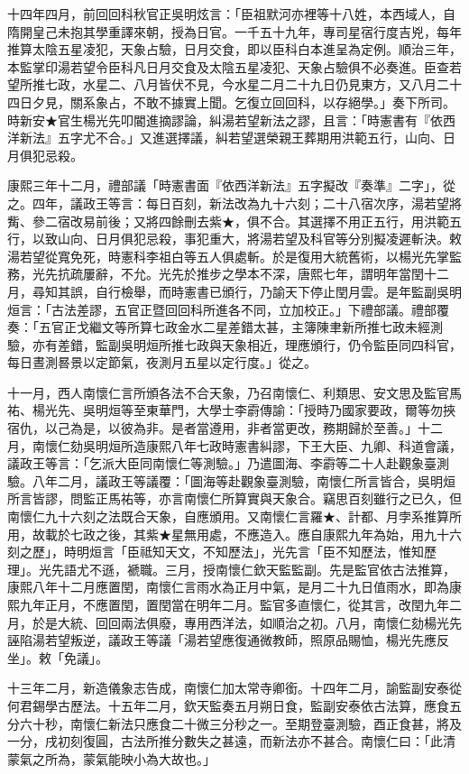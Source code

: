 \begin{pinyinscope}
十四年四月，前回回科秋官正吳明炫言：「臣祖默河亦裡等十八姓，本西域人，自隋開皇己未抱其學重譯來朝，授為日官。一千五十九年，專司星宿行度吉兇，每年推算太陰五星凌犯，天象占驗，日月交食，即以臣科白本進呈為定例。順治三年，本監掌印湯若望令臣科凡日月交食及太陰五星凌犯、天象占驗俱不必奏進。臣查若望所推七政，水星二、八月皆伏不見，今水星二月二十九日仍見東方，又八月二十四日夕見，關系象占，不敢不據實上聞。乞復立回回科，以存絕學。」奏下所司。時新安★官生楊光先叩閽進摘謬論，糾湯若望新法之謬，且言：「時憲書有『依西洋新法』五字尤不合。」又進選擇議，糾若望選榮親王葬期用洪範五行，山向、日月俱犯忌殺。

康熙三年十二月，禮部議「時憲書面『依西洋新法』五字擬改『奏準』二字」，從之。四年，議政王等言：每日百刻，新法改為九十六刻；二十八宿次序，湯若望將觜、參二宿改易前後；又將四餘刪去紫★，俱不合。其選擇不用正五行，用洪範五行，以致山向、日月俱犯忌殺，事犯重大，將湯若望及科官等分別擬凌遲斬決。敕湯若望從寬免死，時憲科李祖白等五人俱處斬。於是復用大統舊術，以楊光先掌監務，光先抗疏屢辭，不允。光先於推步之學本不深，唐熙七年，謂明年當閏十二月，尋知其誤，自行檢舉，而時憲書已頒行，乃諭天下停止閏月雲。是年監副吳明烜言：「古法差謬，五官正暨回回科所進各不同，立加校正。」下禮部議。禮部覆奏：「五官正戈繼文等所算七政金水二星差錯太甚，主簿陳聿新所推七政未經測驗，亦有差錯，監副吳明烜所推七政與天象相近，理應頒行，仍令監臣同四科官，每日晝測晷景以定節氣，夜測月五星以定行度。」從之。

十一月，西人南懷仁言所頒各法不合天象，乃召南懷仁、利類思、安文思及監官馬祐、楊光先、吳明烜等至東華門，大學士李霨傳諭：「授時乃國家要政，爾等勿挾宿仇，以己為是，以彼為非。是者當遵用，非者當更改，務期歸於至善。」十二月，南懷仁劾吳明烜所造康熙八年七政時憲書糾謬，下王大臣、九卿、科道會議，議政王等言：「乞派大臣同南懷仁等測驗。」乃遣圖海、李霨等二十人赴觀象臺測驗。八年二月，議政王等議覆：「圖海等赴觀象臺測驗，南懷仁所言皆合，吳明烜所言皆謬，問監正馬祐等，亦言南懷仁所算實與天象合。竊思百刻雖行之已久，但南懷仁九十六刻之法既合天象，自應頒用。又南懷仁言羅★、計都、月孛系推算所用，故載於七政之後，其紫★星無用處，不應造入。應自康熙九年為始，用九十六刻之歷」，時明烜言「臣祗知天文，不知歷法」，光先言「臣不知歷法，惟知歷理」。光先語尤不遜，褫職。三月，授南懷仁欽天監監副。先是監官依古法推算，康熙八年十二月應置閏，南懷仁言雨水為正月中氣，是月二十九日值雨水，即為康熙九年正月，不應置閏，置閏當在明年二月。監官多直懷仁，從其言，改閏九年二月，於是大統、回回兩法俱廢，專用西洋法，如順治之初。八月，南懷仁劾楊光先誣陷湯若望叛逆，議政王等議「湯若望應復通微教師，照原品賜恤，楊光先應反坐」。敕「免議」。

十三年二月，新造儀象志告成，南懷仁加太常寺卿銜。十四年二月，諭監副安泰從何君錫學古歷法。十五年二月，欽天監奏五月朔日食，監副安泰依古法算，應食五分六十秒，南懷仁新法只應食二十微三分秒之一。至期登臺測驗，酉正食甚，將及一分，戌初刻復圓，古法所推分數失之甚遠，而新法亦不甚合。南懷仁曰：「此清蒙氣之所為，蒙氣能映小為大故也。」


\end{pinyinscope}

